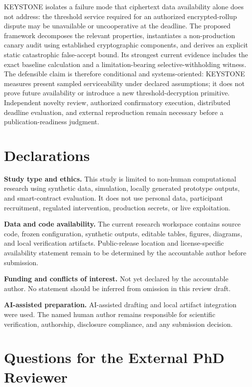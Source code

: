 \documentclass[10pt]{article}
\begin{document}
KEYSTONE isolates a failure mode that ciphertext data availability alone does not address: the threshold service required for an authorized encrypted-rollup dispute may be unavailable or uncooperative at the deadline. The proposed framework decomposes the relevant properties, instantiates a non-production canary audit using established cryptographic components, and derives an explicit static catastrophic false-accept bound. Its strongest current evidence includes the exact baseline calculation and a limitation-bearing selective-withholding witness. The defensible claim is therefore conditional and systems-oriented: KEYSTONE measures present sampled serviceability under declared assumptions; it does not prove future availability or introduce a new threshold-decryption primitive. Independent novelty review, authorized confirmatory execution, distributed deadline evaluation, and external reproduction remain necessary before a publication-readiness judgment.

\section*{Declarations}

\textbf{Study type and ethics.} This study is limited to non-human computational research using synthetic data, simulation, locally generated prototype outputs, and smart-contract evaluation. It does not use personal data, participant recruitment, regulated intervention, production secrets, or live exploitation.

\textbf{Data and code availability.} The current research workspace contains source code, frozen configuration, synthetic outputs, editable tables, figures, diagrams, and local verification artifacts. Public-release location and license-specific availability statement remain to be determined by the accountable author before submission.

\textbf{Funding and conflicts of interest.} Not yet declared by the accountable author. No statement should be inferred from omission in this review draft.

\textbf{AI-assisted preparation.} AI-assisted drafting and local artifact integration were used. The named human author remains responsible for scientific verification, authorship, disclosure compliance, and any submission decision.

\appendix
\section{Questions for the External PhD Reviewer}
\end{document}
